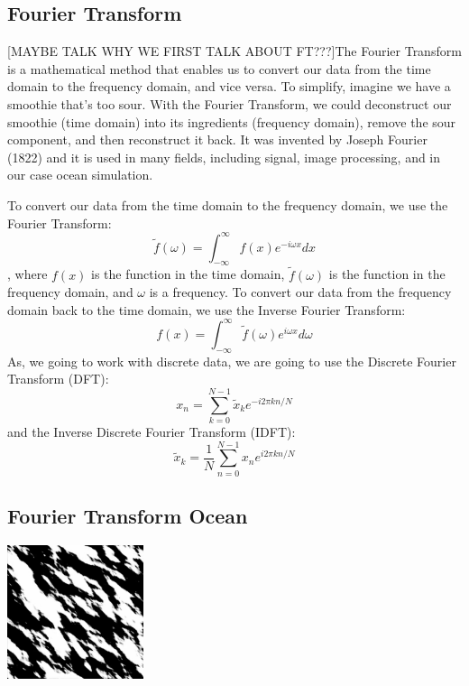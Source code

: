 \subsection{Fourier Transform}
[MAYBE TALK WHY WE FIRST TALK ABOUT FT???]The Fourier Transform is a mathematical method that enables us to convert our data from the time domain to the frequency domain, and vice versa. To simplify, imagine we have a smoothie that’s too sour. With the Fourier Transform, we could deconstruct our smoothie (time domain) into its ingredients (frequency domain), remove the sour component, and then reconstruct it back.
It was invented by Joseph Fourier (1822) \cite{fourier1822} and it is used in many fields, including signal, image processing, and in our case ocean simulation.

To convert our data from the time domain to the frequency domain, we use the Fourier Transform:
\begin{equation}
\tilde{f}(\omega) = \int_{-\infty}^{\infty} f(x) e^{-i \omega x} dx
\end{equation}
, where $f(x)$ is the function in the time domain, $\tilde{f}(\omega)$ is the function in the frequency domain, and $\omega$ is a frequency.
To convert our data from the frequency domain back to the time domain, we use the Inverse Fourier Transform:
\begin{equation}
f(x) = \int_{-\infty}^{\infty} \tilde{f}(\omega) e^{i \omega x} d\omega
\end{equation}
As, we going to work with discrete data, we are going to use the Discrete Fourier Transform (DFT):
\begin{equation}
    x_n = \sum_{k=0}^{N-1} \tilde{x}_k e^{-i 2 \pi k n / N}
\end{equation}
and the Inverse Discrete Fourier Transform (IDFT):
\begin{equation}
    \tilde{x}_k = \frac{1}{N} \sum_{n=0}^{N-1} x_n e^{i 2 \pi k n / N}
    \label{eq:idft}
\end{equation}

\subsection{Fourier Transform Ocean}

\begin{minipage}{1\textwidth}
    \centering
    \includegraphics[width=0.3\textwidth]{"images/philips_height_map.png"}
    \label{fig:tessendorf_height}
\end{minipage}

